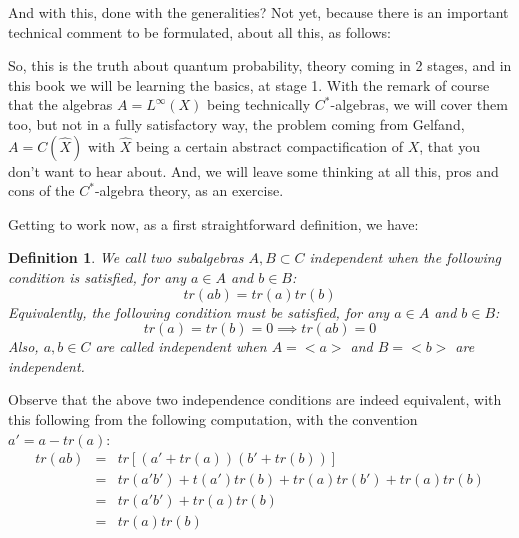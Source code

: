 \documentclass[12pt]{amsbook}
\newtheorem{comment}[theorem]{Comment}
\newtheorem{definition}[theorem]{Definition}
\begin{document}
And with this, done with the generalities? Not yet, because there is an important technical comment to be formulated, about all this, as follows:

So, this is the truth about quantum probability, theory coming in 2 stages, and in this book we will be learning the basics, at stage 1. With the remark of course that the algebras $A=L^\infty(X)$ being technically $C^*$-algebras, we will cover them too, but not in a fully satisfactory way, the problem coming from Gelfand, $A=C(\widehat{X})$ with $\widehat{X}$ being a certain abstract compactification of $X$, that you don't want to hear about. And, we will leave some thinking at all this, pros and cons of the $C^*$-algebra theory, as an exercise.

\bigskip

Getting to work now, as a first straightforward definition, we have:


\begin{definition}
We call two subalgebras $A,B\subset C$ independent when the following condition is satisfied, for any $a\in A$ and $b\in B$: 
$$tr(ab)=tr(a)tr(b)$$
Equivalently, the following condition must be satisfied, for any $a\in A$ and $b\in B$: 
$$tr(a)=tr(b)=0\implies tr(ab)=0$$
Also, $a,b\in C$ are called independent when $A=<a>$ and $B=<b>$ are independent.
\end{definition}

Observe that the above two independence conditions are indeed equivalent, with this following from the following computation, with the convention $a'=a-tr(a)$:
\begin{eqnarray*}
tr(ab)
&=&tr[(a'+tr(a))(b'+tr(b))]\\
&=&tr(a'b')+t(a')tr(b)+tr(a)tr(b')+tr(a)tr(b)\\
&=&tr(a'b')+tr(a)tr(b)\\
&=&tr(a)tr(b)
\end{eqnarray*}
\end{document}
